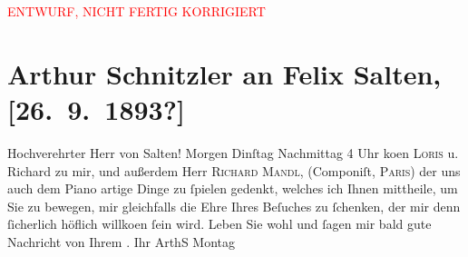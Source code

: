 
\begin{center}
            \textcolor{red}{ENTWURF, NICHT FERTIG KORRIGIERT}
                      \end{center}
            
         
         \renewcommand{\erwaehntePersonen}{Personen: Richard Beer-Hofmann, Hugo von Hofmannsthal, Richard Mandl, Felix Salten}
         \renewcommand{\erwaehnteOrte}{Orte: Paris, Wien}
         \renewcommand{\erwaehnteWerke}{Werke: ?? [Romanprojekt]}
               \section[Arthur Schnitzler an Felix Salten, {[}26. 9. 1893?{]}]{ Arthur Schnitzler an Felix Salten, {[}26. 9. 1893?{]}}\nopagebreak{}\rehead{ }\begin{ledgroupsized}[t]{13cm}\normalsize\beginnumbering \toendnotes[C]{\smallbreak\pagebreak[2]} 
\toendnotes[C]{\smallbreak}\pstart
           \noindent{}{\pb}Hochverehrter Herr von Salten!  Morgen Dinſtag{ }Nachmittag 4 Uhr ko{\geminationm}en \textsc{Loris} u. Richard zu mir, und außerdem Herr \textsc{Richard Mandl}, (Componiſt, \textsc{Paris}) {\pb}der uns auch dem Piano artige Dinge
               zu ſpielen gedenkt, welches ich Ihnen mittheile, um Sie zu bewegen, mir gleichfalls
               die Ehre Ihres Beſuches zu ſchenken, der mir denn {\pb}ſicherlich höflich willko{\geminationm}en ſein wird. \pend
           \pstart
           Leben Sie wohl und ſagen mir bald gute Nachricht von Ihrem \label{K_L02962-1v}\label{K_L02962-1h}. \pend
           \pstart Ihr \spacefill\mbox{ArthS}\pend{}\pstart
           \raggedleft{}Montag\pend
           
         
         \endnumbering{}\end{ledgroupsized}\begin{anhang}\end{anhang}\newcommand{\dateiname}{L02962}\newcommand{\titel}{Arthur Schnitzler an Felix Salten, [26. 9. 1893?]}\newcommand{\editorInnen}{Martin Anton Müller und Laura Untner}
      